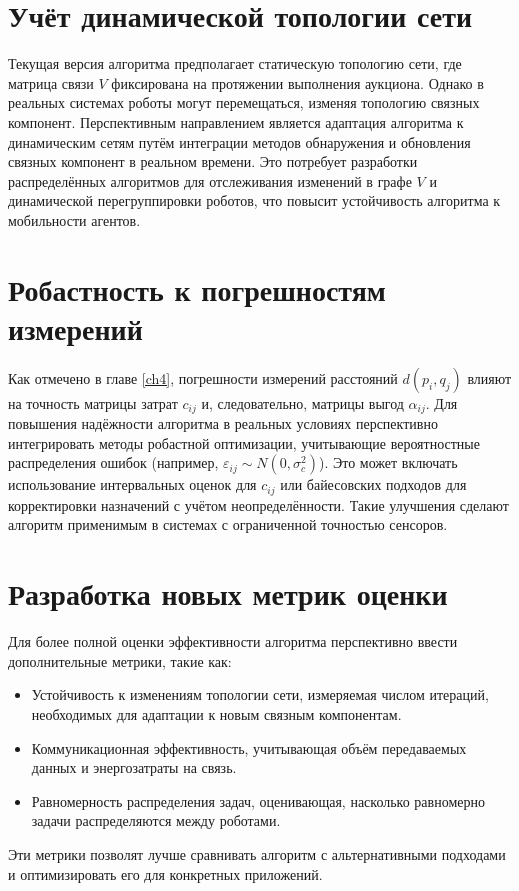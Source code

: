 \section{Учёт динамической топологии сети}
Текущая версия алгоритма предполагает статическую топологию сети, где матрица связи $V$ фиксирована на протяжении выполнения аукциона. Однако в реальных системах роботы могут перемещаться, изменяя топологию связных компонент. Перспективным направлением является адаптация алгоритма к динамическим сетям путём интеграции методов обнаружения и обновления связных компонент в реальном времени. Это потребует разработки распределённых алгоритмов для отслеживания изменений в графе $V$ и динамической перегруппировки роботов, что повысит устойчивость алгоритма к мобильности агентов.

\section{Робастность к погрешностям измерений}
Как отмечено в главе \ref{ch4}, погрешности измерений расстояний $d(p_i, q_j)$ влияют на точность матрицы затрат $c_{ij}$ и, следовательно, матрицы выгод $\alpha_{ij}$. Для повышения надёжности алгоритма в реальных условиях перспективно интегрировать методы робастной оптимизации, учитывающие вероятностные распределения ошибок (например, $\varepsilon_{ij} \sim N(0, \sigma_c^2)$). Это может включать использование интервальных оценок для $c_{ij}$ или байесовских подходов для корректировки назначений с учётом неопределённости. Такие улучшения сделают алгоритм применимым в системах с ограниченной точностью сенсоров.

\section{Разработка новых метрик оценки}
Для более полной оценки эффективности алгоритма перспективно ввести дополнительные метрики, такие как:
\begin{itemize}
    \item Устойчивость к изменениям топологии сети, измеряемая числом итераций, необходимых для адаптации к новым связным компонентам.
    \item Коммуникационная эффективность, учитывающая объём передаваемых данных и энергозатраты на связь.
    \item Равномерность распределения задач, оценивающая, насколько равномерно задачи распределяются между роботами.
\end{itemize}
Эти метрики позволят лучше сравнивать алгоритм с альтернативными подходами и оптимизировать его для конкретных приложений.

